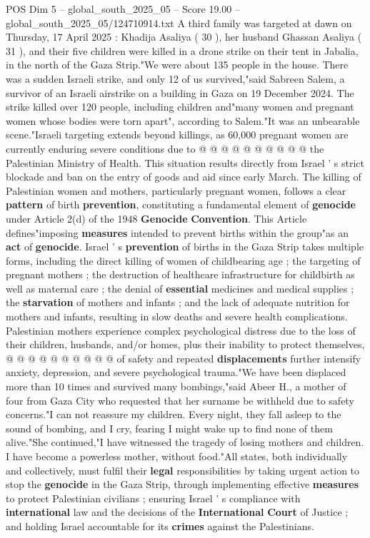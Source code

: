 \begin{textsample}{POS Dim 5 – global\_south\_2025\_05 – Score 19.00 – global\_south\_2025\_05/124710914.txt}
A third family was targeted at dawn on Thursday, 17 April 2025 : Khadija Asaliya ( 30 ), her husband Ghassan Asaliya ( 31 ), and their five children were killed in a drone strike on their tent in Jabalia, in the north of the Gaza Strip."We were about 135 people in the house.
There was a sudden Israeli strike, and only 12 of us survived,"said Sabreen Salem, a survivor of an Israeli airstrike on a building in Gaza on 19 December 2024.
The strike killed over 120 people, including children and"many women and pregnant women whose bodies were torn apart", according to Salem."It was an unbearable scene."Israeli targeting extends beyond killings, as 60,000 pregnant women are currently enduring severe conditions due to @ @ @ @ @ @ @ @ @ @ the Palestinian Ministry of Health.
This situation results directly from Israel ' s strict blockade and ban on the entry of goods and aid since early March.
The killing of Palestinian women and mothers, particularly pregnant women, follows a clear \textbf{pattern} of birth \textbf{prevention}, constituting a fundamental element of \textbf{genocide} under Article 2(d) of the 1948 \textbf{Genocide} \textbf{Convention}.
This Article defines"imposing \textbf{measures} intended to prevent births within the group"as an \textbf{act} of \textbf{genocide}.
Israel ' s \textbf{prevention} of births in the Gaza Strip takes multiple forms, including the direct killing of women of childbearing age ; the targeting of pregnant mothers ; the destruction of healthcare infrastructure for childbirth as well as maternal care ; the denial of \textbf{essential} medicines and medical supplies ; the \textbf{starvation} of mothers and infants ; and the lack of adequate nutrition for mothers and infants, resulting in slow deaths and severe health complications.
Palestinian mothers experience complex psychological distress due to the loss of their children, husbands, and/or homes, plus their inability to protect themselves, @ @ @ @ @ @ @ @ @ @ of safety and repeated \textbf{displacements} further intensify anxiety, depression, and severe psychological trauma."We have been displaced more than 10 times and survived many bombings,"said Abeer H., a mother of four from Gaza City who requested that her surname be withheld due to safety concerns."I can not reassure my children.
Every night, they fall asleep to the sound of bombing, and I cry, fearing I might wake up to find none of them alive."She continued,"I have witnessed the tragedy of losing mothers and children.
I have become a powerless mother, without food."All states, both individually and collectively, must fulfil their \textbf{legal} responsibilities by taking urgent action to stop the \textbf{genocide} in the Gaza Strip, through implementing effective \textbf{measures} to protect Palestinian civilians ; ensuring Israel ' s compliance with \textbf{international} law and the decisions of the \textbf{International} \textbf{Court} of Justice ; and holding Israel accountable for its \textbf{crimes} against the Palestinians.

\end{textsample}
